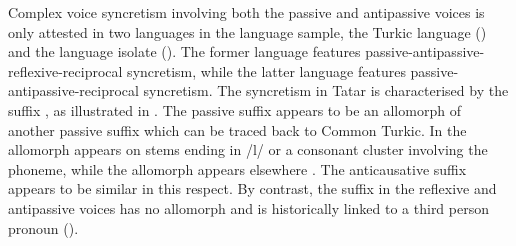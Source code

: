 Complex voice syncretism involving both the passive and antipassive voices is only attested in two languages in the language sample, the Turkic language  () and the language isolate  (). The former language features passive-antipassive-reflexive-reciprocal syncretism, while the latter language features passive-antipassive-reciprocal syncretism. The syncretism in Tatar is cha\-rac\-te\-ri\-sed by the suffix , as illustrated in . The passive suffix  appears to be an allomorph of another passive suffix  which can be traced back to Common Turkic. In  the allomorph  appears on stems ending in /l/ or a consonant cluster involving the phoneme, while the allomorph  appears elsewhere \citep[473]{burbiel:2018}. The anticausative suffix  appears to be similar in this respect. By contrast, the suffix  in the reflexive and antipassive voices has no allomorph  and is historically linked to a third person pronoun ().




